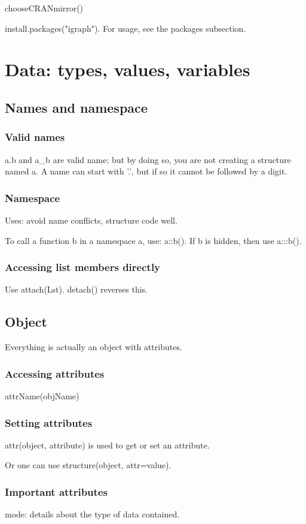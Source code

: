 \documentclass[oneside, article]{memoir}
\begin{document}
chooseCRANmirror()

install.packages("igraph"). For usage, see the packages subsection.

\section{Data: types, values, variables}
\subsection{Names and namespace}
\subsubsection{Valid names}
a.b and a\_b are valid name; but by doing so, you are not creating a structure named a. A name can start with '.', but if so it cannot be followed by a digit.

\subsubsection{Namespace}
Uses: avoid name conflicts, structure code well.

To call a function b in a namespace a, use: a::b(). If b is hidden, then use a:::b().

\subsubsection{Accessing list members directly}
Use attach(Lst). detach() reverses this.

\subsection{Object}
Everything is actually an object with attributes.

\subsubsection{Accessing attributes}
attrName(objName)

\subsubsection{Setting attributes}
attr(object, attribute) is used to get or set an attribute.

Or one can use structure(object, attr=value).

\subsubsection{Important attributes}
mode: details about the type of data contained.
\end{document}
